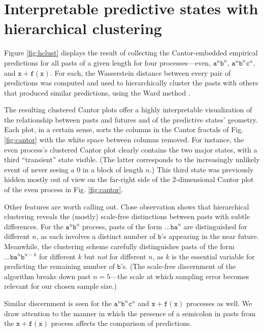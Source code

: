 \documentclass[draft,aps,pre,twocolumn,groupaddress,showkeys,nofootinbib,preprintnumbers,floatfix]{revtex4-2}
\begin{document}
\section{Interpretable predictive states with hierarchical clustering}

Figure \ref{fig:hclust} displays the result of collecting the Cantor-embedded
empirical predictions for all pasts of a given length for four processes---even,
$\mathtt{a}^n \mathtt{b}^n$, $\mathtt{a}^n \mathtt{b}^n \mathtt{c}^n$, and
$\mathtt{x+f(x)}$. For each, the Wasserstein distance between every pair of
predictions was computed and used to hierarchically cluster the pasts with
others that produced similar predictions, using the Ward method \cite{Mull11a}.

The resulting clustered Cantor plots offer a highly interpretable visualization
of the relationship between pasts and futures and of the predictive states'
geometry. Each plot, in a certain sense, sorts the columns in the Cantor
fractals of Fig. \ref{fig:cantor} with the white space between columns removed.
For instance, the even process's clustered Cantor plot clearly contains the two
major states, with a third ``transient'' state visible. (The latter corresponds
to the increasingly unlikely event of never seeing a $0$ in a block of length
$n$.) This third state was previously hidden mostly out of view on the
far-right side of the $2$-dimensional Cantor plot of the even process in Fig.
\ref{fig:cantor}.

Other features are worth calling out. Close observation shows that hierarchical
clustering reveals the (mostly) scale-free distinctions between pasts with
subtle differences. For the $\mathtt{a}^n \mathtt{b}^n$ process, pasts of the
form $\dots \mathtt{b a}^n$ are distinguished for different $n$, as each
involves a distinct number of $\mathtt{b}$'s appearing in the near future.
Meanwhile, the clustering scheme carefully distinguishes pasts of the form
$\dots \mathtt{b a}^n \mathtt{b}^{n-k}$ for different $k$ but \emph{not} for
different $n$, as $k$ is the essential variable for predicting the remaining
number of $\mathtt{b}$'s. (The scale-free discernment of the algorithm breaks
down past $n=5$---the scale at which sampling error becomes relevant for our
chosen sample size.)

Similar discernment is seen for the $\mathtt{a}^n \mathtt{b}^n \mathtt{c}^n$
and $\mathtt{x+f(x)}$ processes as well. We draw attention to the manner in
which the presence of a semicolon in pasts from the $\mathtt{x+f(x)}$ process
affects the comparison of predictions.
\end{document}
